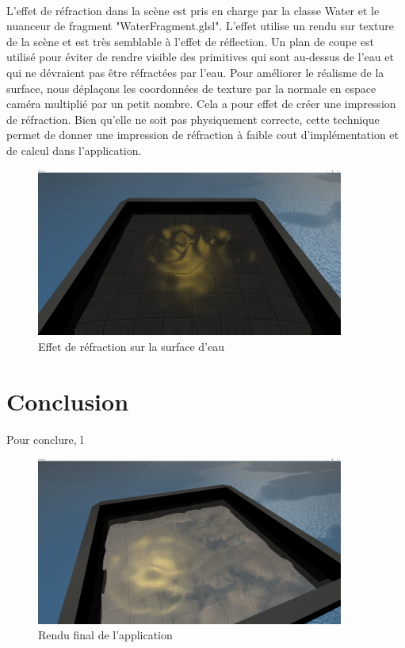 \documentclass[a4paper, 12pt]{article} %
\begin{document}
	\paragraph{}
	L'effet de réfraction dans la scène est pris en charge par la classe Water et le nuanceur de fragment "WaterFragment.glsl". L'effet utilise un rendu sur 
	texture de la scène et est très semblable à l'effet de réflection. Un plan de coupe est utilisé pour éviter de rendre visible des primitives qui sont au-dessus
	de l'eau et qui ne dévraient pas être réfractées par l'eau. Pour améliorer le réalisme de la surface, nous déplaçons les coordonnées de texture par la normale 
	en espace caméra multiplié par un petit nombre. Cela a pour effet de créer une impression de réfraction. Bien qu'elle ne soit pas physiquement correcte, cette
	technique permet de donner une impression de réfraction à faible cout d'implémentation et de calcul dans l'application.
\begin{figure}
	\centering
	\includegraphics[width=0.9\textwidth]{./PhotoRapport/Refraction.png}
	\caption{Effet de réfraction sur la surface d'eau}
	\label{Refraction}
\end{figure}
\section{Conclusion}
Pour conclure, l 
\begin{figure}
	\centering
	\includegraphics[width=0.9\textwidth]{./PhotoRapport/EffetFinal.png}
	\caption{Rendu final de l'application}
	\label{EffetFinal}
\end{figure}
\end{document}

